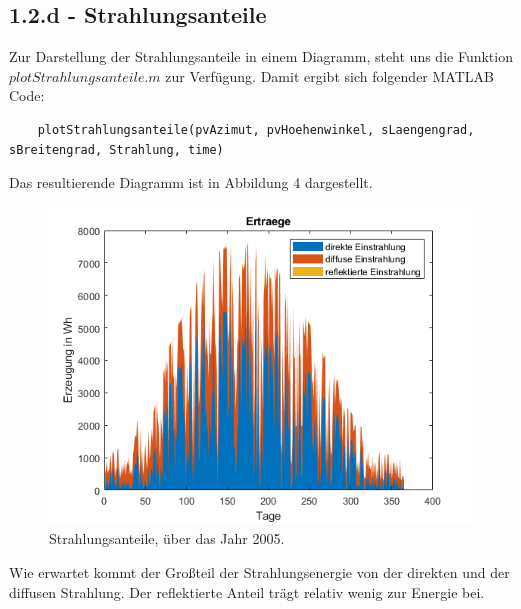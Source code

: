 \documentclass[a4paper,12pt]{article}
\begin{document}
	\subsection{1.2.d - Strahlungsanteile}
	Zur Darstellung der Strahlungsanteile in einem Diagramm, steht uns die Funktion $plotStrahlungsanteile.m$ zur Verfügung.\newline
	Damit ergibt sich folgender MATLAB Code:
	\begin{lstlisting}
	plotStrahlungsanteile(pvAzimut, pvHoehenwinkel, sLaengengrad, sBreitengrad, Strahlung, time)
	\end{lstlisting}
	Das resultierende Diagramm ist in Abbildung 4 dargestellt.
	\begin{figure}[H]
		\centering
		\includegraphics[width=12cm]{img/results/Strahlungsanteile}
		\caption{Strahlungsanteile, über das Jahr 2005.}
	\end{figure}
	Wie erwartet kommt der Großteil der Strahlungsenergie von der direkten und der diffusen Strahlung. Der reflektierte Anteil trägt relativ wenig zur Energie bei.
\end{document}
